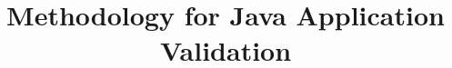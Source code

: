 \documentclass[10pt]{article}
\title{Methodology for Java Application Validation}
\author{}
\begin{document}
\maketitle      
\begin{abstract}
\end{abstract}
        
        





\end{document}
